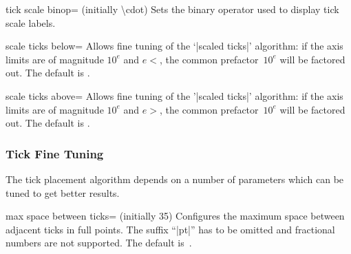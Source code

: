 \begin{pgfplotskey}{tick scale binop= (initially \textbackslash cdot)}
	Sets the binary operator used to display tick scale labels.
\begin{codeexample}[]
\end{codeexample}

\begin{codeexample}[]
\end{codeexample}
\end{pgfplotskey}

\begin{pgfplotskey}{scale ticks below=}
Allows fine tuning of the `|scaled ticks|' algorithm: if the axis limits are of magnitude $10^e$ and $e<$, the common prefactor~$10^e$ will be factored out. The default is 
\makeatletter
\pgfplots@scale@ticks@below@exponent
\makeatother.
\end{pgfplotskey}

\begin{pgfplotskey}{scale ticks above=}
Allows fine tuning of the '|scaled ticks|' algorithm: if the axis limits are of magnitude $10^e$ and $e>$, the common prefactor~$10^e$ will be factored out. The default is
\makeatletter
\pgfplots@scale@ticks@above@exponent
\makeatother.
\end{pgfplotskey}


\subsubsection{Tick Fine Tuning}
The tick placement algorithm depends on a number of parameters which can be tuned to get better results.
\begin{pgfplotskey}{max space between ticks= (initially 35)}
\label{maxspacebetweenticks}
	Configures the maximum space between adjacent ticks in full points. The suffix ``|pt|'' has to be omitted and fractional numbers are not supported. The default is~\axisdefaulttickwidth.
\end{pgfplotskey}

